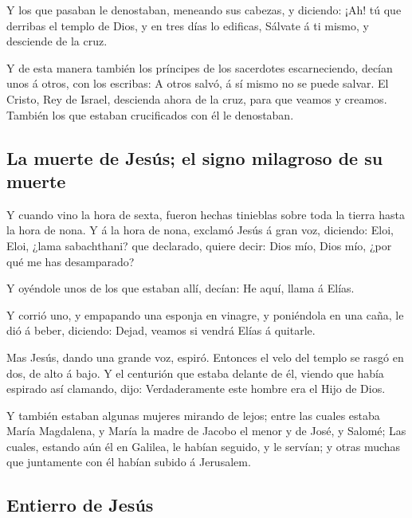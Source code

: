  Y los que pasaban le denostaban, meneando sus cabezas, y
diciendo: ¡Ah! tú que derribas el templo de Dios, y en tres días lo
edificas,  Sálvate á ti mismo, y desciende de la cruz.

 Y de esta manera también los príncipes de los sacerdotes
escarneciendo, decían unos á otros, con los escribas: A otros salvó, á
sí mismo no se puede salvar.  El Cristo, Rey de Israel,
descienda ahora de la cruz, para que veamos y creamos. También los que
estaban crucificados con él le denostaban.

\hypertarget{la-muerte-de-jesuxfas-el-signo-milagroso-de-su-muerte}{%
\subsection{La muerte de Jesús; el signo milagroso de su
muerte}\label{la-muerte-de-jesuxfas-el-signo-milagroso-de-su-muerte}}

 Y cuando vino la hora de sexta, fueron hechas tinieblas
sobre toda la tierra hasta la hora de nona.  Y á la hora
de nona, exclamó Jesús á gran voz, diciendo: Eloi, Eloi, ¿lama
sabachthani? que declarado, quiere decir: Dios mío, Dios mío, ¿por qué
me has desamparado?

 Y oyéndole unos de los que estaban allí, decían: He
aquí, llama á Elías.

 Y corrió uno, y empapando una esponja en vinagre, y
poniéndola en una caña, le dió á beber, diciendo: Dejad, veamos si
vendrá Elías á quitarle.

 Mas Jesús, dando una grande voz, espiró. 
Entonces el velo del templo se rasgó en dos, de alto á bajo.
 Y el centurión que estaba delante de él, viendo que
había espirado así clamando, dijo: Verdaderamente este hombre era el
Hijo de Dios.

 Y también estaban algunas mujeres mirando de lejos;
entre las cuales estaba María Magdalena, y María la madre de Jacobo el
menor y de José, y Salomé;  Las cuales, estando aún él en
Galilea, le habían seguido, y le servían; y otras muchas que juntamente
con él habían subido á Jerusalem.

\hypertarget{entierro-de-jesuxfas}{%
\subsection{Entierro de Jesús}\label{entierro-de-jesuxfas}}

